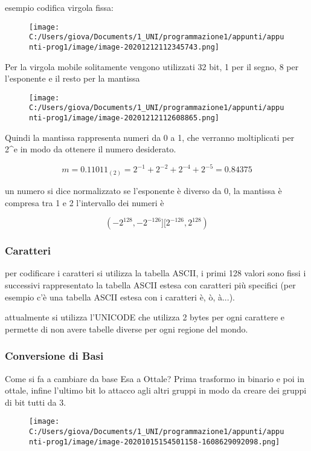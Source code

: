 \documentclass[
]{article}
\begin{document}
esempio codifica virgola fissa:

\begin{figure}
\centering
\texttt{[image: C:/Users/giova/Documents/1\_UNI/programmazione1/appunti/appunti-prog1/image/image-20201212112345743.png]}
\caption{}
\end{figure}

Per la virgola mobile solitamente vengono utilizzati 32 bit, 1 per il
segno, 8 per l'esponente e il resto per la mantissa

\begin{figure}
\centering
\texttt{[image: C:/Users/giova/Documents/1\_UNI/programmazione1/appunti/appunti-prog1/image/image-20201212112608865.png]}
\caption{}
\end{figure}

Quindi la mantissa rappresenta numeri da 0 a 1, che verranno
moltiplicati per 2\^{}e in modo da ottenere il numero desiderato.

\[m=0.11011_{(2)} =  2^{-1}+2^{-2}+2^{-4}+2^{-5} = 0.84375\]

un numero si dice normalizzato se l'esponente è diverso da 0, la
mantissa è compresa tra 1 e 2 l'intervallo dei numeri è

\[(-2^{128}, -2^{-126}][2^{-126}, 2^{128})\]

\hypertarget{header-n516}{%
\subsubsection{Caratteri}\label{header-n516}}

per codificare i caratteri si utilizza la tabella ASCII, i primi 128
valori sono fissi i successivi rappresentato la tabella ASCII estesa con
caratteri più specifici (per esempio c'è una tabella ASCII estesa con i
caratteri è, ò, à...).

attualmente si utilizza l'UNICODE che utilizza 2 bytes per ogni
carattere e permette di non avere tabelle diverse per ogni regione del
mondo.

\hypertarget{header-n519}{%
\subsubsection{Conversione di Basi}\label{header-n519}}

Come si fa a cambiare da base Esa a Ottale? Prima trasformo in binario e
poi in ottale, infine l'ultimo bit lo attacco agli altri gruppi in modo
da creare dei gruppi di bit tutti da 3.

\begin{figure}
\centering
\texttt{[image: C:/Users/giova/Documents/1\_UNI/programmazione1/appunti/appunti-prog1/image/image-20201015154501158-1608629092098.png]}
\caption{}
\end{figure}
\end{document}
